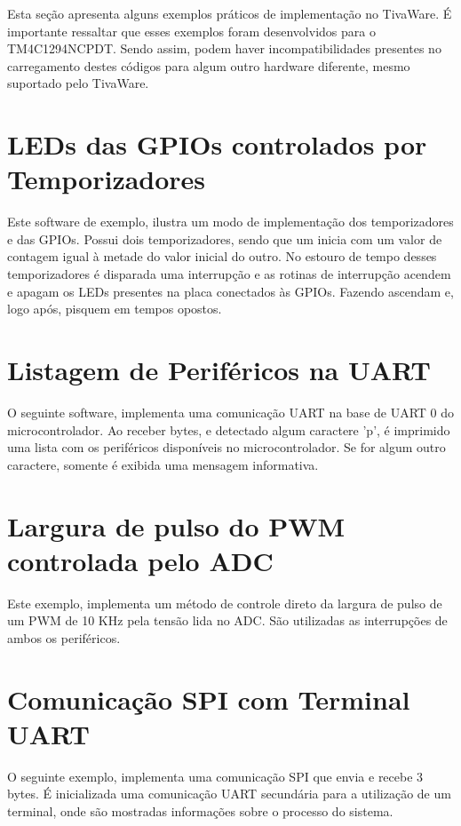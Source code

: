 Esta seção apresenta alguns exemplos práticos de implementação no TivaWare. É importante ressaltar que esses exemplos foram desenvolvidos para o TM4C1294NCPDT. Sendo assim, podem haver incompatibilidades presentes no carregamento destes códigos para algum outro hardware diferente, mesmo suportado pelo TivaWare.

\minitocsection

\section{LEDs das GPIOs controlados por Temporizadores}
\label{sec:exTimer}

Este software de exemplo, ilustra um modo de implementação dos temporizadores e das GPIOs. Possui dois temporizadores, sendo que um inicia com um valor de contagem igual à metade do valor inicial do outro. No estouro de tempo desses temporizadores é disparada uma interrupção e as rotinas de interrupção acendem e apagam os LEDs presentes na placa conectados às GPIOs. Fazendo ascendam e, logo após, pisquem em tempos opostos.



\section{Listagem de Periféricos na UART}
\label{sec:exUart}
O seguinte software, implementa uma comunicação UART na base de UART 0 do microcontrolador. Ao receber bytes, e detectado algum caractere 'p', é imprimido uma lista com os periféricos disponíveis no microcontrolador. Se for algum outro caractere, somente é exibida uma mensagem informativa.



\section{Largura de pulso do PWM controlada pelo ADC}
\label{sec:exPwm}

Este exemplo, implementa um método de controle direto da largura de pulso de um PWM de 10 KHz  pela tensão lida no ADC. São utilizadas as interrupções de ambos os periféricos.



\section{Comunicação SPI com Terminal UART}
\label{sec:exSSI}

O seguinte exemplo, implementa uma comunicação SPI que envia e recebe 3 bytes. É inicializada uma comunicação UART secundária para a utilização de um terminal, onde são mostradas informações sobre o processo do sistema.


